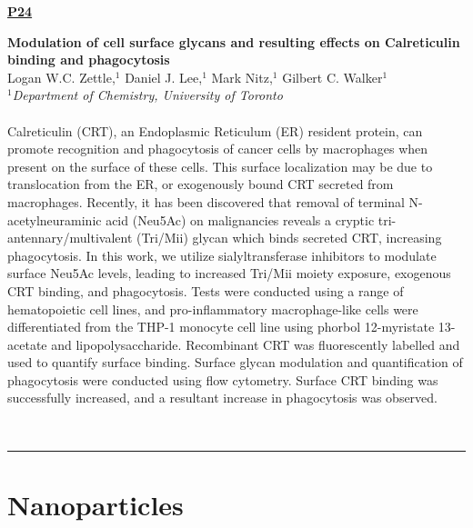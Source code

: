 \documentclass[titlepage,oneside,openany,10pt]{book}
\newenvironment{posterabs}[4] %
        {
	\begin{flushright}
                \underline{\textbf{#4}}
        \end{flushright}
        \textbf{#1}\\%
        #2\\%
        \textit{#3}\\\\%
        }
        {
        \\
        \noindent\rule{15cm}{0.5pt}%
        }
\begin{document}
\begin{posterabs}
    {Modulation of cell surface glycans and resulting effects on Calreticulin binding and phagocytosis}
    {Logan W.C. Zettle,$^{1}$ Daniel J. Lee,$^{1}$ Mark Nitz,$^{1}$ Gilbert C. Walker$^{1}$}
    {
    $^1$Department of Chemistry, University of Toronto
    }
    {P24}
    Calreticulin (CRT), an Endoplasmic Reticulum (ER) resident protein, can promote recognition and phagocytosis of cancer cells by macrophages when present on the surface of these cells. This surface localization may be due to translocation from the ER, or exogenously bound CRT secreted from macrophages. Recently, it has been discovered that removal of terminal N-acetylneuraminic acid (Neu5Ac) on malignancies reveals a cryptic tri-antennary/multivalent (Tri/Mii) glycan which binds secreted CRT, increasing phagocytosis. In this work, we utilize sialyltransferase inhibitors to modulate surface Neu5Ac levels, leading to increased Tri/Mii moiety exposure, exogenous CRT binding, and phagocytosis. Tests were conducted using a range of hematopoietic cell lines, and pro-inflammatory macrophage-like cells were differentiated from the THP-1 monocyte cell line using phorbol 12-myristate 13-acetate and lipopolysaccharide. Recombinant CRT was fluorescently labelled and used to quantify surface binding. Surface glycan modulation and quantification of phagocytosis were conducted using flow cytometry. Surface CRT binding was successfully increased, and a resultant increase in phagocytosis was observed.
    \label{ZettleL}
\end{posterabs}


\newpage

\section*{Nanoparticles}
\label{sec:nanop}
\end{document}
